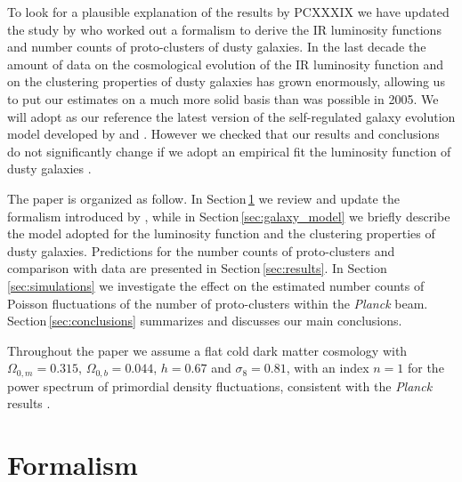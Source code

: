 \documentclass[useAMS,usenatbib]{mn2e}
\begin{document}
To look for a plausible explanation of the results by
PCXXXIX we have updated the study by
\citet{Negrello2005} who worked out a formalism to derive the IR
luminosity functions and number counts of proto-clusters of dusty
galaxies. In the last decade the amount of data on the cosmological
evolution of the IR luminosity function and on the clustering
properties of dusty galaxies has grown enormously, allowing us to put
our estimates on a much more solid basis than was possible in 2005. We
will adopt as our reference the latest \cite{Cai2013} version of the
self-regulated galaxy evolution model developed by \cite{Granato2004} and \cite{Lapi2006,Lapi2011}.
However we checked that our results and conclusions do not significantly change
if we adopt an empirical fit the luminosity function of dusty
galaxies \citep[e.g.][]{Mancuso2016}.

The paper is organized as follow. In Section\,\ref{sec:formalism} we
review and update the formalism introduced by \citet{Negrello2005}, while in
Section\,\ref{sec:galaxy_model} we briefly describe the model adopted
for the luminosity function and the clustering properties of dusty
galaxies. Predictions for the number counts of proto-clusters and
comparison with data are presented in Section\,\ref{sec:results}. In
Section\,\ref{sec:simulations} we investigate the effect on the estimated number
counts of Poisson fluctuations of the number of proto-clusters within the \textit{Planck} beam. Section\,\ref{sec:conclusions} summarizes and discusses our main conclusions.

Throughout the paper we assume a flat cold dark matter cosmology with
$\Omega_{0,m}=0.315$, $\Omega_{0,b}=0.044$, $h=0.67$ and
$\sigma_{8}=0.81$, with an index $n=1$ for the power spectrum of primordial density fluctuations, consistent with the \textit{Planck} results \citep{PlanckCollaborationXIII2016}.



\section{Formalism}\label{sec:formalism}
\end{document}
